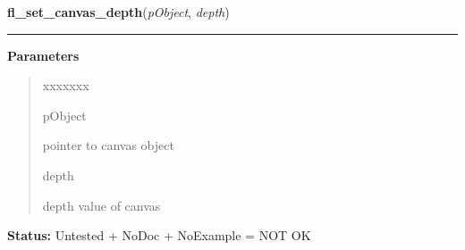 \hspace{.8\funcindent}\begin{boxedminipage}{\funcwidth}

    \raggedright \textbf{fl\_set\_canvas\_depth}(\textit{pObject}, \textit{depth})

    \vspace{-1.5ex}

    \rule{\textwidth}{0.5\fboxrule}
\setlength{\parskip}{2ex}
\setlength{\parskip}{1ex}
      \textbf{Parameters}
      \vspace{-1ex}

      \begin{quote}
        \begin{Ventry}{xxxxxxx}

          \item[pObject]

          pointer to canvas object

          \item[depth]

          depth value of canvas

        \end{Ventry}

      \end{quote}

\textbf{Status:} Untested + NoDoc + NoExample = NOT OK



    \end{boxedminipage}

    \label{xformslib:library:fl_set_canvas_attributes}

    \vspace{0.5ex}

